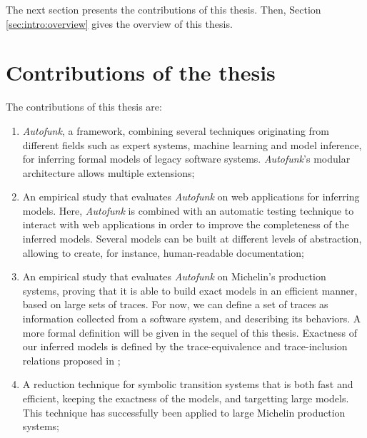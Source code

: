 
The next section presents the contributions of this thesis.
Then, Section \ref{sec:intro:overview} gives the overview of this
thesis.


\section{Contributions of the thesis}
\label{sec:intro:contrib}

The contributions of this thesis are:

\begin{enumerate}
    \item \textit{Autofunk}, a framework, combining several
        techniques originating from different fields such as
        expert systems, machine learning and model inference, for
        inferring formal models of legacy software systems.
        \textit{Autofunk}'s modular architecture allows multiple
        extensions;

    \item An empirical study that evaluates \textit{Autofunk} on
        web applications for inferring models. Here,
        \textit{Autofunk} is combined with an automatic testing
        technique to interact with web applications in order to
        improve the completeness of the inferred models. Several
        models can be built at different levels of abstraction,
        allowing to create, for instance, human-readable
        documentation;

    \item An empirical study that evaluates \textit{Autofunk} on
        Michelin's production systems, proving that it is able to
        build exact models in an efficient manner, based on large
        sets of traces. For now, we can define a set of traces as
        information collected from a software system, and
        describing its behaviors. A more formal definition will
        be given in the sequel of this thesis. Exactness of our
        inferred models is defined by the trace-equivalence and
        trace-inclusion relations proposed in \cite{petrenko06};

    \item A reduction technique for symbolic transition systems
        that is both fast and efficient, keeping the exactness of
        the models, and targetting large models. This technique
        has successfully been applied to large Michelin
        production systems;


\end{enumerate}
